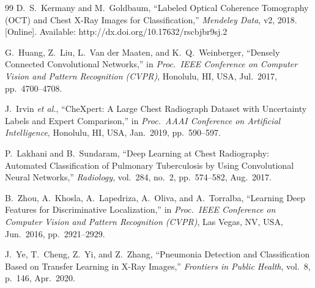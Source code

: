 \documentclass[conference]{IEEEtran}
\begin{document}
\begin{thebibliography}{99}
D.~S.~Kermany and M.~Goldbaum, ``Labeled Optical Coherence Tomography (OCT) and Chest X-Ray Images for Classification,'' \emph{Mendeley Data}, v2, 2018. [Online]. Available: http://dx.doi.org/10.17632/rscbjbr9sj.2

G.~Huang, Z.~Liu, L.~Van der Maaten, and K.~Q.~Weinberger, ``Densely Connected Convolutional Networks,'' in \emph{Proc.\ IEEE Conference on Computer Vision and Pattern Recognition (CVPR)}, Honolulu, HI, USA, Jul.\ 2017, pp.~4700--4708.

J.~Irvin \textit{et al.}, ``CheXpert: A Large Chest Radiograph Dataset with Uncertainty Labels and Expert Comparison,'' in \emph{Proc.\ AAAI Conference on Artificial Intelligence}, Honolulu, HI, USA, Jan.\ 2019, pp.~590--597.

P.~Lakhani and B.~Sundaram, ``Deep Learning at Chest Radiography: Automated Classification of Pulmonary Tuberculosis by Using Convolutional Neural Networks,'' \emph{Radiology}, vol.~284, no.~2, pp.~574--582, Aug.\ 2017.

B.~Zhou, A.~Khosla, A.~Lapedriza, A.~Oliva, and A.~Torralba, ``Learning Deep Features for Discriminative Localization,'' in \emph{Proc.\ IEEE Conference on Computer Vision and Pattern Recognition (CVPR)}, Las Vegas, NV, USA, Jun.\ 2016, pp.~2921--2929.

J.~Ye, T.~Cheng, Z.~Yi, and Z.~Zhang, ``Pneumonia Detection and Classification Based on Transfer Learning in X-Ray Images,'' \emph{Frontiers in Public Health}, vol.~8, p.~146, Apr.\ 2020.

\end{thebibliography}
\end{document}
